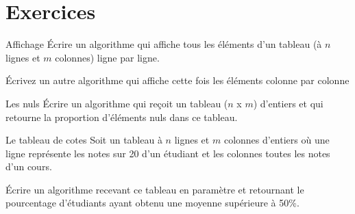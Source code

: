 \section{Exercices}

	\begin{Exercice}{Affichage}
		Écrire un algorithme qui affiche tous les éléments d'un
		tableau (à $n$ lignes et $m$ colonnes) ligne par ligne.
		
		Écrivez un autre algorithme qui affiche cette fois les éléments
		colonne par colonne
	\end{Exercice}
	
	\begin{Exercice}{Les nuls}
		Écrire un algorithme qui reçoit un tableau ($n$ x $m$)
		d'entiers et qui retourne la proportion
		d'éléments nuls dans ce tableau.
	\end{Exercice}
	
	\begin{Exercice}{Le tableau de cotes}
		Soit un tableau à $n$ lignes et $m$ colonnes d'entiers où
		une ligne représente les notes sur 20 d'un étudiant et
		les colonnes toutes les notes d'un cours.
		
		Écrire un algorithme recevant ce tableau en paramètre et retournant le
		pourcentage d'étudiants ayant obtenu une moyenne
		supérieure à 50\%.
	\end{Exercice}
	
